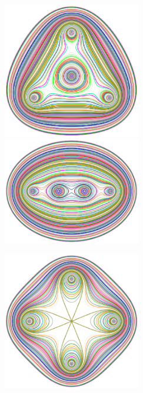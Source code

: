\documentclass{article}
\begin{document}
\begin{exa}
\begin{figure}[H]
\begin{minipage}{0.5\hsize}
\begin{center}
\includegraphics[width=6cm]{images/cassini4_omusubi.eps}
\caption{}
\label{ }
\end{center}
\end{minipage}
\begin{minipage}{0.5\hsize}
\begin{center}
\includegraphics[width=6cm]{images/cassini4_aligned.eps}
\caption{}
\label{ }
\end{center}
\end{minipage}
\end{figure}
\begin{figure}[H]
\begin{center}
\includegraphics[width=6cm]{images/cassini4_clover.eps}
\caption{}
\label{ }
\end{center}
\end{figure}
\end{exa}
\end{document}
